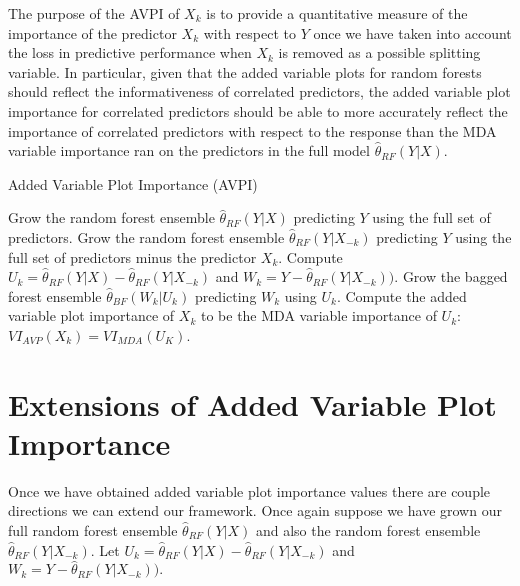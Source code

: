 \documentclass[12pt,twoside]{reedthesis}
\theoremstyle{definition}
\theoremstyle{definition}
\theoremstyle{definition}
\theoremstyle{remark}
\begin{document}
The purpose of the AVPI of \(X_k\) is to provide a quantitative measure
of the importance of the predictor \(X_k\) with respect to \(Y\) once we
have taken into account the loss in predictive performance when \(X_k\)
is removed as a possible splitting variable. In particular, given that
the added variable plots for random forests should reflect the
informativeness of correlated predictors, the added variable plot
importance for correlated predictors should be able to more accurately
reflect the importance of correlated predictors with respect to the
response than the MDA variable importance ran on the predictors in the
full model \(\hat{\theta}_{RF}(Y|X)\).
\begin{algorithm}
    \caption{Added Variable Plot Importance (AVPI)} \label{added variable importance}
      \begin{algorithmic}[1]
          \State Grow the random forest ensemble $\hat{\theta}_{RF}(Y|X)$ predicting $Y$ using the full set of predictors. 
            \State Grow the random forest ensemble $\hat{\theta}_{RF}(Y|X_{-k})$ predicting $Y$ using the full set of predictors minus the predictor $X_k$.
            \State Compute $U_k=\hat{\theta}_{RF}(Y|X)-\hat{\theta}_{RF}(Y|X_{-k})$ and $W_k=Y-\hat{\theta}_{RF}(Y|X_{-k})).$
            \State Grow the bagged forest ensemble $\hat{\theta}_{BF}(W_k|U_k)$ predicting $W_k$ using $U_k$. 
            \State Compute the added variable plot importance of $X_k$ to be the MDA variable importance of $U_k$: $VI_{AVP}(X_k)=VI_{MDA}(U_K)$.
          \EndFor
      \end{algorithmic}
  \end{algorithm}
\section{Extensions of Added Variable Plot
Importance}\label{extensions-of-added-variable-plot-importance}

Once we have obtained added variable plot importance values there are
couple directions we can extend our framework. Once again suppose we
have grown our full random forest ensemble \(\hat{\theta}_{RF}(Y|X)\)
and also the random forest ensemble \(\hat{\theta}_{RF}(Y|X_{-k})\). Let
\(U_k=\hat{\theta}_{RF}(Y|X)-\hat{\theta}_{RF}(Y|X_{-k})\) and
\(W_k=Y-\hat{\theta}_{RF}(Y|X_{-k})).\)
\end{document}
